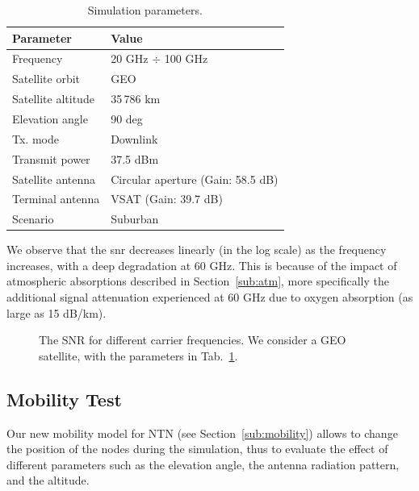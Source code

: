 \begin{table}[t!]
\caption{Simulation parameters.}
\label{tab:frequency-test}
\centering
\footnotesize
\begin{tabular}{|l|l|}
\hline
\textbf{Parameter} & \textbf{Value} \\ \hline
{Frequency} & {20 GHz $\div$ 100 GHz} \\\hline
{Satellite orbit} & {GEO} \\\hline
{Satellite altitude} & {35\,786 km} \\\hline
{Elevation angle} & {90 deg} \\\hline
{Tx. mode} & {Downlink} \\\hline
{Transmit power} & {37.5 dBm} \\\hline
{Satellite  antenna} & {Circular aperture (Gain: 58.5 dB)} \\\hline
{Terminal antenna} & {VSAT (Gain: 39.7 dB)} \\\hline
 {Scenario} & {Suburban} \\\hline
\end{tabular}
\end{table}

We observe that the \gls{snr} decreases linearly (in the log scale) as the frequency increases, with a deep degradation at 60 GHz. This is because of the impact of atmospheric absorptions described in Section~\ref{sub:atm}, more specifically the additional signal attenuation experienced at 60 GHz due to oxygen absorption (as large as 15 dB/km).

\begin{figure}[t]
    \centering 
    \setlength{}
    \setlength{}
    
    \caption{The SNR for different carrier frequencies. We consider a GEO satellite, with the parameters in Tab.~\ref{tab:frequency-test}.}
    \label{fig:frequency-test}
\end{figure}

\subsection{Mobility Test}
Our new mobility model for NTN (see Section~\ref{sub:mobility}) allows to change the position of the nodes during the simulation, thus to evaluate the effect of different parameters such as the elevation angle, the antenna radiation pattern, and the altitude. 

